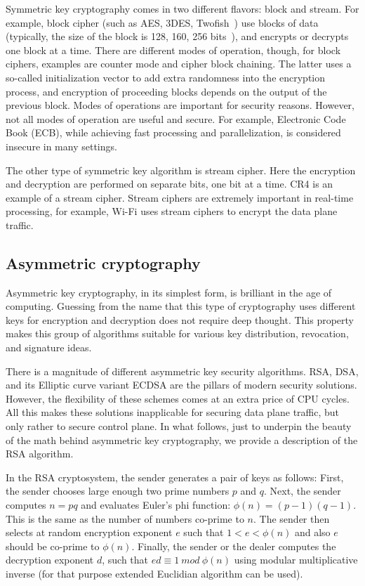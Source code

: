 Symmetric key cryptography comes in two different flavors: block and stream. 
For example, block cipher (such as AES, 3DES, Twofish~\cite{Stinson:Cryptography}) 
use blocks of data (typically, the size of the block is 128, 160, 256 
bits~\cite{Stinson:Cryptography}), and encrypts or 
decrypts one block at a time. There are different modes of operation, though, 
for block ciphers, examples are counter mode and cipher block chaining. 
The latter uses a so-called initialization vector to add extra randomness into the encryption 
process, and encryption of proceeding blocks depends on the output of the previous 
block. Modes of operations are important for security reasons. However, not all 
modes of operation are useful and secure. For example, Electronic Code Book (ECB), 
while achieving fast processing and parallelization, is considered insecure in 
many settings.

The other type of symmetric key algorithm is stream cipher. Here the encryption 
and decryption are performed on separate bits, one bit at a time. CR4 is an example 
of a stream cipher. Stream ciphers are extremely important in real-time processing, 
for example, Wi-Fi uses stream ciphers to encrypt the data plane traffic.

\subsection{Asymmetric cryptography}

Asymmetric key cryptography, in its simplest form, is brilliant in the age 
of computing. Guessing from the name that this type of cryptography uses different 
keys for encryption and decryption does not require deep thought. This property makes 
this group of algorithms suitable for various key distribution, revocation, and 
signature ideas. 

There is a magnitude of different asymmetric key security algorithms. 
RSA, DSA, and its Elliptic curve variant ECDSA are the pillars of modern 
security solutions. However, the flexibility of these schemes comes at an extra 
price of CPU cycles. All this makes these solutions inapplicable for securing 
data plane traffic, but only rather to secure control plane. In what follows, 
just to underpin the beauty of the math behind asymmetric key cryptography, 
we provide a description of the RSA algorithm.

In the RSA cryptosystem, the sender generates a pair of keys as follows: 
First, the sender chooses large enough two prime numbers $p$ and $q$. Next, 
the sender computes $n=pq$ and evaluates Euler’s phi function: $\phi(n)=(p-1)(q-1)$. 
This is the same as the number of numbers co-prime to $n$. The sender then selects at 
random encryption exponent $e$ such that $1<e<\phi(n)$ and also $e$ should be co-prime to $\phi(n)$.
Finally, the sender or the dealer computes the decryption exponent $d$, such that 
$ed \equiv 1\ mod\ \phi(n)$ using modular multiplicative inverse (for that purpose extended Euclidian 
algorithm can be used).

